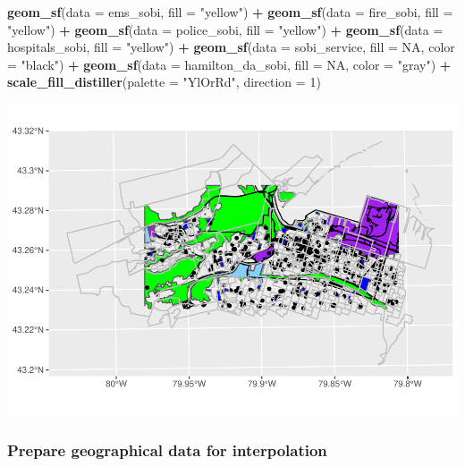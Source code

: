 \documentclass[
]{article}
\newenvironment{Shaded}{\begin{snugshade}}{\end{snugshade}}
\newcommand{\DataTypeTok}[1]{\textcolor[rgb]{0.13,0.29,0.53}{#1}}
\newcommand{\DecValTok}[1]{\textcolor[rgb]{0.00,0.00,0.81}{#1}}
\newcommand{\KeywordTok}[1]{\textcolor[rgb]{0.13,0.29,0.53}{\textbf{#1}}}
\newcommand{\NormalTok}[1]{#1}
\newcommand{\OperatorTok}[1]{\textcolor[rgb]{0.81,0.36,0.00}{\textbf{#1}}}
\newcommand{\OtherTok}[1]{\textcolor[rgb]{0.56,0.35,0.01}{#1}}
\newcommand{\StringTok}[1]{\textcolor[rgb]{0.31,0.60,0.02}{#1}}
\begin{document}
\begin{Shaded}
\begin{Highlighting}[]
\StringTok{  }\KeywordTok{geom_sf}\NormalTok{(}\DataTypeTok{data =}\NormalTok{ ems_sobi,}
          \DataTypeTok{fill =} \StringTok{"yellow"}\NormalTok{) }\OperatorTok{+}
\StringTok{  }\KeywordTok{geom_sf}\NormalTok{(}\DataTypeTok{data =}\NormalTok{ fire_sobi,}
          \DataTypeTok{fill =} \StringTok{"yellow"}\NormalTok{) }\OperatorTok{+}
\StringTok{  }\KeywordTok{geom_sf}\NormalTok{(}\DataTypeTok{data =}\NormalTok{ police_sobi,}
          \DataTypeTok{fill =} \StringTok{"yellow"}\NormalTok{) }\OperatorTok{+}
\StringTok{  }\KeywordTok{geom_sf}\NormalTok{(}\DataTypeTok{data =}\NormalTok{ hospitals_sobi,}
          \DataTypeTok{fill =} \StringTok{"yellow"}\NormalTok{) }\OperatorTok{+}
\StringTok{  }\KeywordTok{geom_sf}\NormalTok{(}\DataTypeTok{data =}\NormalTok{ sobi_service,}
          \DataTypeTok{fill =} \OtherTok{NA}\NormalTok{,}
          \DataTypeTok{color =} \StringTok{"black"}\NormalTok{) }\OperatorTok{+}
\StringTok{  }\KeywordTok{geom_sf}\NormalTok{(}\DataTypeTok{data =}\NormalTok{ hamilton_da_sobi,}
          \DataTypeTok{fill =} \OtherTok{NA}\NormalTok{,}
          \DataTypeTok{color =} \StringTok{"gray"}\NormalTok{) }\OperatorTok{+}
\StringTok{  }\KeywordTok{scale_fill_distiller}\NormalTok{(}\DataTypeTok{palette =} \StringTok{"YlOrRd"}\NormalTok{, }\DataTypeTok{direction =} \DecValTok{1}\NormalTok{)}
\end{Highlighting}
\end{Shaded}

\includegraphics{00-Data-Processing-Example_files/figure-latex/unnamed-chunk-53-1.pdf}

\hypertarget{prepare-geographical-data-for-interpolation}{%
\subsubsection{Prepare geographical data for
interpolation}\label{prepare-geographical-data-for-interpolation}}
\end{document}
